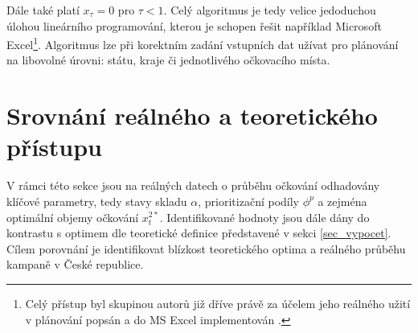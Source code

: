 
Dále také platí $x_{\tau}=0$ pro $\tau<1$.
Celý algoritmus je tedy velice jedoduchou úlohou lineárního programování, kterou je schopen řešit například Microsoft Excel\footnote{Celý přístup byl skupinou autorů již dříve právě za účelem jeho reálného užití v plánování popsán a do MS Excel implementován \cite{calc_blog}.}. Algoritmus lze při korektním zadání vstupních dat užívat pro plánování na libovolné úrovni: státu, kraje či jednotlivého očkovacího místa. 
%

\section*{Srovnání reálného a teoretického přístupu}

%
V rámci této sekce jsou na reálných datech o průběhu očkování odhadovány klíčové parametry, tedy stavy skladu $\alpha$, prioritizační podíly $\phi^{p}$ a zejména optimální objemy očkování $x_{t}^{2*}$. Identifikované hodnoty jsou dále dány do kontrastu s optimem dle teoretické definice představené v sekci \ref{sec_vypocet}. 
Cílem porovnání je identifikovat blízkost teoretického optima a reálného průběhu kampaně v České republice.




